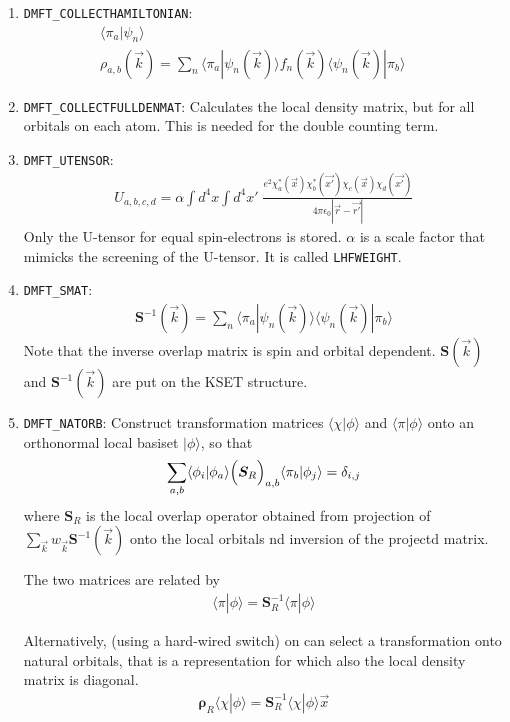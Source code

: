 \documentclass[11pt,a4paper]{report}
\newcommand{\mat}[1]{\bm{#1}}  %
\begin{document}
\begin{enumerate}
\item \verb|DMFT_COLLECTHAMILTONIAN|:
\begin{eqnarray}
\langle\pi_a|\psi_n\rangle&&
\\
\rho_{a,b}(\vec{k})=\sum_n
\langle\pi_a|\psi_n(\vec{k})\rangle f_n(\vec{k})
\langle\psi_n(\vec{k})|\pi_b\rangle
\end{eqnarray}
%
\item \verb|DMFT_COLLECTFULLDENMAT|: Calculates the local density matrix,
  but for all orbitals on each atom. This is needed for the double
  counting term.
%
\item \verb|DMFT_UTENSOR|: 
\begin{eqnarray}
U_{a,b,c,d}=\alpha\int d^4x\int d^4x'\;
\frac{e^2\chi^*_a(\vec{x})\chi^*_b(\vec{x'})\chi_c(\vec{x})\chi_d(\vec{x'})}
{4\pi\epsilon_0|\vec{r}-\vec{r'}|}
\label{eq:defutensordmftobject}
\end{eqnarray}
Only the U-tensor for equal spin-electrons is stored. $\alpha$ is a
scale factor that mimicks the screening of the U-tensor. It is called
\verb|LHFWEIGHT|.
%
\item \verb|DMFT_SMAT|:
\begin{eqnarray}
\mat{S}^{-1}(\vec{k})
=\sum_n\langle\pi_a|\psi_n(\vec{k})\rangle\langle\psi_n(\vec{k})|\pi_b\rangle
\end{eqnarray}
Note that the inverse overlap matrix is spin and orbital dependent.
$\mat{S}(\vec{k})$ and $\mat{S}^{-1}(\vec{k})$ are put on the KSET
structure.
%
\item \verb|DMFT_NATORB|: Construct transformation matrices
  $\langle\chi|\phi\rangle$ and $\langle\pi|\phi\rangle$ onto an
  orthonormal local basiset $|\phi\rangle$, so that 
\begin{eqnarray}
\sum_{a,b}
\langle\phi_i|\phi_a\rangle\Bigl(\mat{S}_R\Bigr)_{a,b}
\langle\pi_b|\phi_j\rangle=\delta_{i,j}
\end{eqnarray}
where $\mat{S}_R$ is the local overlap operator obtained from
projection of $\sum_{\vec{k}} w_{\vec{k}}\mat{S}^{-1}(\vec{k})$ onto the
local orbitals nd inversion of the projectd matrix.

The two matrices are related by
\begin{eqnarray}
\langle\pi|\phi\rangle=\mat{S}^{-1}_R\langle\pi|\phi\rangle
\end{eqnarray}

Alternatively, (using a hard-wired switch) on can select a
transformation onto natural orbitals, that is a representation for
which also the local density matrix is diagonal.
\begin{eqnarray}
\mat{\rho}_R\langle\chi|\phi\rangle=\mat{S}^{-1}_R
\langle\chi|\phi\rangle \vec{x}
\end{eqnarray}


\end{enumerate}
\end{document}
